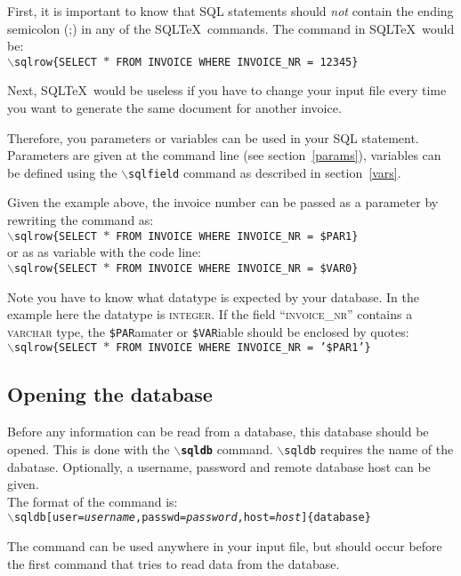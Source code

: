 \documentclass{article}
\newcommand{\bs}{\ensuremath{\backslash}}
\newcommand{\vs}{\vspace{3mm}}
\begin{document}
First, it is important to know that SQL statements should \textit{not} contain the ending semicolon (;) in
any of the SQL\TeX\ commands. The command in SQL\TeX\ would be:\\
\texttt{\bs sqlrow\{SELECT $\ast$ FROM INVOICE WHERE INVOICE\_NR = 12345\}}

Next, SQL\TeX\ would be useless if you have to change your input file every time you want to generate
the same document for another invoice.

\vs

Therefore, you parameters or variables can be used in your SQL statement. Parameters are given at the command
line (see section~\ref{params}), variables can be defined using the \texttt{\bs sqlfield} command as
described in section~\ref{vars}.

Given the example above, the invoice number can be passed as a parameter by rewriting the command as: \\
\texttt{\bs sqlrow\{SELECT $\ast$ FROM INVOICE WHERE INVOICE\_NR = \$PAR1\}} \\
or as as variable with the code line: \\
\texttt{\bs sqlrow\{SELECT $\ast$ FROM INVOICE WHERE INVOICE\_NR = \$VAR0\}}

Note you have to know what datatype is expected by your database. In the example here the datatype is
\textsc{integer}. If the field ``\textsc{invoice\_nr}'' contains a \textsc{varchar} type, the
\texttt{\$PAR}amater or \texttt{\$VAR}iable should be enclosed by quotes: \\
\texttt{\bs sqlrow\{SELECT $\ast$ FROM INVOICE WHERE INVOICE\_NR = '\$PAR1'\}}

\subsection{Opening the database}\label{opendb}

Before any information can be read from a database, this database should be opened.
This is done with the \texttt{\textbf{\bs sqldb}} command.
\texttt{\bs sqldb} requires the name of the dabatase. Optionally, a username, password and remote database host can be given. \\
The format of the command is:\\
\texttt{\bs sqldb[user=\textit{username},passwd=\textit{password},host=\textit{host}]\{database\}}

The command can be used anywhere in your input file, but should occur before the first command that tries to
read data from the database.
\end{document}
